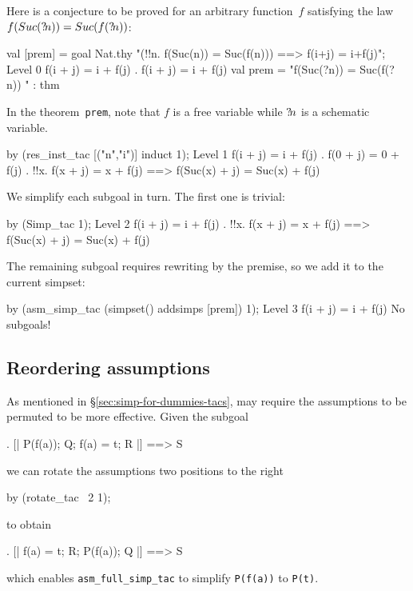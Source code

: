 Here is a conjecture to be proved for an arbitrary function~$f$
satisfying the law $f(Suc({?\!n})) = Suc(f({?\!n}))$:
\begin{ttbox}
val [prem] = goal Nat.thy
    "(!!n. f(Suc(n)) = Suc(f(n))) ==> f(i+j) = i+f(j)";
{\out Level 0}
{\out f(i + j) = i + f(j)}
{. f(i + j) = i + f(j)}
\ttbreak
{\out val prem = "f(Suc(?n)) = Suc(f(?n))}
{\out             [!!n. f(Suc(n)) = Suc(f(n))]" : thm}
\end{ttbox}
In the theorem~\texttt{prem}, note that $f$ is a free variable while
${?\!n}$ is a schematic variable.
\begin{ttbox}
by (res_inst_tac [("n","i")] induct 1);
{\out Level 1}
{\out f(i + j) = i + f(j)}
{. f(0 + j) = 0 + f(j)}
{. !!x. f(x + j) = x + f(j) ==> f(Suc(x) + j) = Suc(x) + f(j)}
\end{ttbox}
We simplify each subgoal in turn.  The first one is trivial:
\begin{ttbox}
by (Simp_tac 1);
{\out Level 2}
{\out f(i + j) = i + f(j)}
{. !!x. f(x + j) = x + f(j) ==> f(Suc(x) + j) = Suc(x) + f(j)}
\end{ttbox}
The remaining subgoal requires rewriting by the premise, so we add it
to the current simpset:
\begin{ttbox}
by (asm_simp_tac (simpset() addsimps [prem]) 1);
{\out Level 3}
{\out f(i + j) = i + f(j)}
{\out No subgoals!}
\end{ttbox}

\subsection{Reordering assumptions}
\label{sec:reordering-asms}

As mentioned in \S\ref{sec:simp-for-dummies-tacs},
 may require the assumptions to be permuted
to be more effective.  Given the subgoal
\begin{ttbox}
{. [| P(f(a)); Q; f(a) = t; R |] ==> S}
\end{ttbox}
we can rotate the assumptions two positions to the right
\begin{ttbox}
by (rotate_tac ~2 1);
\end{ttbox}
to obtain
\begin{ttbox}
{. [| f(a) = t; R; P(f(a)); Q |] ==> S}
\end{ttbox}
which enables \verb$asm_full_simp_tac$ to simplify \verb$P(f(a))$ to
\verb$P(t)$.

